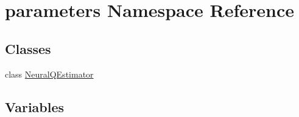\hypertarget{namespaceparameters}{}\section{parameters Namespace Reference}
\label{namespaceparameters}
\subsection*{Classes}
\begin{DoxyCompactItemize}
\item 
class \hyperlink{classparameters_1_1_neural_q_estimator}{Neural\+Q\+Estimator}
\end{DoxyCompactItemize}
\subsection*{Variables}
